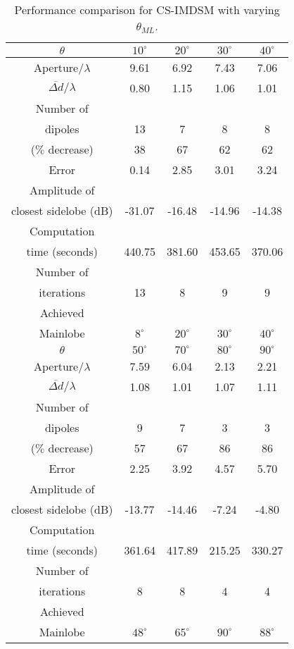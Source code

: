 \documentclass[10pt,final]{IEEEtran}
\begin{document}
\begin{table}
\caption{\rm Performance comparison for CS-IMDSM with varying $\theta_{ML}$.} \centering
\begin{tabular}{|c|c|c|c|c|}
  \hline
  $\theta$ & $10^{\circ}$ & $20^{\circ}$ & $30^{\circ}$ & $40^{\circ}$ \\
  \hline
  Aperture/$\lambda$ & 9.61 & 6.92 &7.43  &7.06  \\
  $\overline{\Delta{d}}/\lambda$ & 0.80 & 1.15 & 1.06 & 1.01  \\
  \hline
  Number of &  &  &  &   \\
  dipoles & 13 & 7 &8  &8 \\
  ($\%$ decrease) & 38 & 67 & 62& 62\\
  \hline
  Error & 0.14 & 2.85 & 3.01 & 3.24  \\
  \hline
  Amplitude of &  &  &  &   \\
  closest sidelobe (dB)& -31.07 & -16.48 &  -14.96& -14.38 \\
  \hline
  Computation &  &  & &   \\
  time (seconds) &440.75  &381.60  &453.65  &370.06   \\
  \hline
  Number of &  &  & &   \\
  iterations & 13 & 8 &9  &9   \\
  \hline
  Achieved & & & & \\
   Mainlobe & $8^{\circ}$ & $20^{\circ}$ & $30^{\circ}$ &  $40^{\circ}$ \\
  \hline
  \hline
  $\theta$ & $50^{\circ}$  & $70^{\circ}$ & $80^{\circ}$ & $90^{\circ}$\\
  \hline
  Aperture/$\lambda$ &7.59 &6.04 &2.13 &2.21 \\
  $\overline{\Delta{d}}/\lambda$ &1.08 &1.01 &1.07 &1.11  \\
  \hline
  Number of  & & & &  \\
  dipoles &9 &7 & 3&  3\\
  ($\%$ decrease) & 57 &67  &86 & 86\\
  \hline
  Error & 2.25& 3.92& 4.57&5.70  \\
  \hline
  Amplitude of  & & & &  \\
  closest sidelobe (dB)&-13.77 &-14.46 &-7.24  &-4.80 \\
  \hline
  Computation  & & & &  \\
  time (seconds) & 361.64&417.89 & 215.25&330.27  \\
  \hline
  Number of  & & & &  \\
  iterations &8 & 8&4 &4  \\
  \hline
  Achieved & & & & \\
   Mainlobe & $48^{\circ}$ & $65^{\circ}$ &$90^{\circ}$  & $88^{\circ}$  \\
  \hline
\end{tabular}
\label{tb:offcs1}
\end{table}
\end{document}
